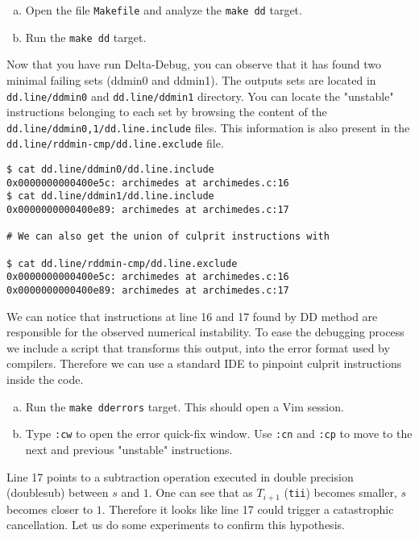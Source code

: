 \begin{question}
  \begin{enumerate}[(a)]
    \item Open the file \texttt{Makefile} and analyze the \texttt{make dd} target.
    \item Run the \texttt{make dd} target.
  \end{enumerate}
\end{question}

Now that you have run Delta-Debug, you can observe that it has found two minimal failing sets (ddmin0 and ddmin1). The outputs sets are located in \texttt{dd.line/ddmin0} and \texttt{dd.line/ddmin1} directory. You can locate the "unstable" instructions belonging to each set by browsing the content of the \texttt{dd.line/ddmin{0,1}/dd.line.include} files. This information is also present in the \texttt{dd.line/rddmin-cmp/dd.line.exclude} file.

\begin{verbatim}
$ cat dd.line/ddmin0/dd.line.include
0x0000000000400e5c: archimedes at archimedes.c:16
$ cat dd.line/ddmin1/dd.line.include
0x0000000000400e89: archimedes at archimedes.c:17

# We can also get the union of culprit instructions with

$ cat dd.line/rddmin-cmp/dd.line.exclude
0x0000000000400e5c: archimedes at archimedes.c:16
0x0000000000400e89: archimedes at archimedes.c:17
\end{verbatim}

We can notice that instructions at line 16 and 17 found by DD method are responsible for the observed numerical instability. To ease the debugging process we include a script that transforms this output, into the error format used by compilers. Therefore we can use a standard IDE to pinpoint culprit instructions inside the code.

\begin{question}
  \begin{enumerate}[(a)]
    \item Run the \texttt{make dderrors} target. This should open a Vim session.
    \item Type \texttt{:cw} to open the error quick-fix window. Use \texttt{:cn} and \texttt{:cp} to move to the next and previous "unstable" instructions.
  \end{enumerate}
\end{question}

Line 17 points to a subtraction operation executed in double precision (doublesub) between $s$ and $1$. One can see that as $T_{i+1}$ (\texttt{tii}) becomes smaller, $s$ becomes closer to $1$. Therefore it looks like line 17 could trigger a catastrophic cancellation.
Let us do some experiments to confirm this hypothesis.

